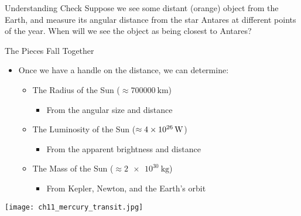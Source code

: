 \documentclass[pdf, aspectratio=169]{beamer}
\begin{document}
\begin{frame}{Understanding Check}
  Suppose we see some distant (orange) object from the Earth, and measure its angular distance from the star Antares at different points of the year. When will we see the object as being closest to Antares?
  \begin{center}
  \end{center}
\end{frame}

\begin{frame}{The Pieces Fall Together}
  \begin{itemize}
	\item Once we have a handle on the distance, we can determine:
	  \begin{itemize}
		\item The Radius of the Sun ($\approx \SI{700000}{\kilo\meter}$)
		  \begin{itemize}
			\item From the angular size and distance
		  \end{itemize}
		\item The Luminosity of the Sun ($\approx \SI{4E26}{\watt}$)
		  \begin{itemize}
			\item From the apparent brightness and distance
		  \end{itemize}
		\item The Mass of the Sun ($\approx \SI{2e30}{\kilo\gram}$)
		  \begin{itemize}
			\item From Kepler, Newton, and the Earth's orbit
		  \end{itemize}
	  \end{itemize}
  \end{itemize}
  \begin{center}
	\texttt{[image: ch11\_mercury\_transit.jpg]}
  \end{center}
\end{frame}
\end{document}
